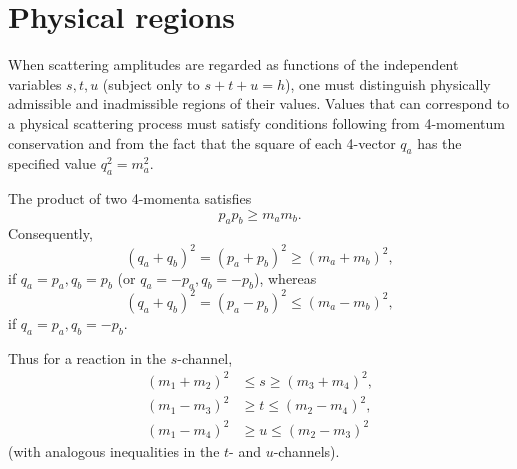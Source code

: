 \section{Physical regions}

When scattering amplitudes are regarded as functions of the independent variables $s,t,u$ (subject only to $s+t+u=h$), one must distinguish physically admissible and inadmissible regions of their values. Values that can correspond to a physical scattering process must satisfy conditions following from 4-momentum conservation and from the fact that the square of each 4-vector $q_a$ has the specified value $q_a^2=m_a^2$.

The product of two 4-momenta satisfies
\begin{equation}
p_ap_b\geqslant m_am_b.
\tag{67.1}
\end{equation}
Consequently,
\[
(q_a+q_b)^2=(p_a+p_b)^2\geqslant(m_a+m_b)^2,
\]
if $q_a=p_a,q_b=p_b$ (or $q_a=-p_a,q_b=-p_b$), whereas
\[
(q_a+q_b)^2=(p_a-p_b)^2\leqslant(m_a-m_b)^2,
\]
if $q_a=p_a,q_b=-p_b$.

Thus for a reaction in the $s$-channel,
\begin{equation}
\begin{aligned}
(m_1+m_2)^2&\leqslant s\geqslant(m_3+m_4)^2,\\
(m_1-m_3)^2&\geqslant t\leqslant(m_2-m_4)^2,\\
(m_1-m_4)^2&\geqslant u\leqslant(m_2-m_3)^2
\end{aligned}
\tag{67.2}
\end{equation}
(with analogous inequalities in the $t$- and $u$-channels).

